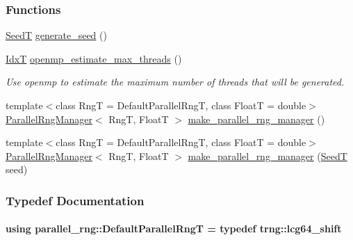 \subsubsection*{Functions}
\begin{DoxyCompactItemize}
\item 
\hyperlink{namespaceparallel__rng_a462b8721a1aabe3b86582e864640c707}{SeedT} \hyperlink{namespaceparallel__rng_ae9d03797791785f0b9512fc2ef69bfb7}{generate\+\_\+seed} ()
\item 
\hyperlink{namespaceparallel__rng_aa22fa3e339aee5927780aac099dfc6f3}{IdxT} \hyperlink{namespaceparallel__rng_a6165820e910d529d0287c1b1314be94e}{openmp\+\_\+estimate\+\_\+max\+\_\+threads} ()
\begin{DoxyCompactList}\small\item\em Use openmp to estimate the maximum number of threads that will be generated. \end{DoxyCompactList}\item 
{\footnotesize template$<$class RngT  = Default\+Parallel\+RngT, class FloatT  = double$>$ }\\\hyperlink{classparallel__rng_1_1ParallelRngManager}{Parallel\+Rng\+Manager}$<$ RngT, FloatT $>$ \hyperlink{namespaceparallel__rng_a1442f14113d25568626a66f85c40e4ee}{make\+\_\+parallel\+\_\+rng\+\_\+manager} ()
\item 
{\footnotesize template$<$class RngT  = Default\+Parallel\+RngT, class FloatT  = double$>$ }\\\hyperlink{classparallel__rng_1_1ParallelRngManager}{Parallel\+Rng\+Manager}$<$ RngT, FloatT $>$ \hyperlink{namespaceparallel__rng_a3d16c2aa5295d7ebeacbb87cb38c8e85}{make\+\_\+parallel\+\_\+rng\+\_\+manager} (\hyperlink{namespaceparallel__rng_a462b8721a1aabe3b86582e864640c707}{SeedT} seed)
\end{DoxyCompactItemize}


\subsubsection{Typedef Documentation}
\paragraph[{\texorpdfstring{Default\+Parallel\+RngT}{DefaultParallelRngT}}]{\setlength{\rightskip}{0pt plus 5cm}using {\bf parallel\+\_\+rng\+::\+Default\+Parallel\+RngT} = typedef trng\+::lcg64\+\_\+shift}\hypertarget{namespaceparallel__rng_a4cb66b089d51a2a89cf6deac41c9b15f}{}\label{namespaceparallel__rng_a4cb66b089d51a2a89cf6deac41c9b15f}



